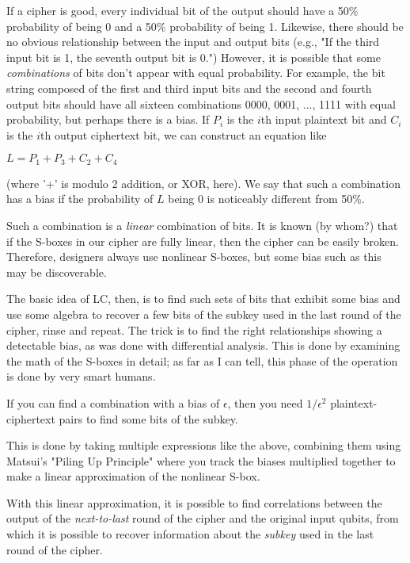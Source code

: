 If a cipher is good, every individual bit of the output should have a
50\% probability of being 0 and a 50\% probability of being 1.
Likewise, there should be no obvious relationship between the input
and output bits (e.g., "If the third input bit is 1, the seventh
output bit is 0.")  However, it is possible that some \emph{combinations}
of bits don't appear with equal probability. For example, the bit
string composed of the first and third input bits and the second and
fourth output bits should have all sixteen combinations 0000, 0001,
..., 1111 with equal probability, but perhaps there is a bias.  If $P_i$
is the $i$th input plaintext bit and $C_i$ is the $i$th output ciphertext
bit, we can construct an equation like

$L = P_1 + P_3 + C_2 + C_4$

(where '+' is modulo 2 addition, or XOR, here).  We say that such a
combination has a bias if the probability of $L$ being 0 is noticeably
different from 50\%.

Such a combination is a \emph{linear} combination of bits.  It is known (by
whom?) that if the S-boxes in our cipher are fully linear, then the
cipher can be easily broken.  Therefore, designers always use
nonlinear S-boxes, but some bias such as this may be discoverable.

The basic idea of LC, then, is to find such sets of bits that exhibit
some bias and use some algebra to recover a few bits of the subkey
used in the last round of the cipher, rinse and repeat.  The trick is
to find the right relationships showing a detectable bias, as was done
with differential analysis.  This is done by examining the math of the
S-boxes in detail; as far as I can tell, this phase of the operation
is done by very smart humans.

If you can find a combination with a bias of $\epsilon$, then you need
$1/\epsilon^2$ plaintext-ciphertext pairs to find some bits of the
subkey.

This is done by taking multiple expressions like the above, combining
them using Matsui's "Piling Up Principle" where you track the biases
multiplied together to make a linear approximation of the nonlinear
S-box.

With this linear approximation, it is possible to find correlations
between the output of the \emph{next-to-last} round of the cipher and the
original input qubits, from which it is possible to recover
information about the \emph{subkey} used in the last round of the cipher.

